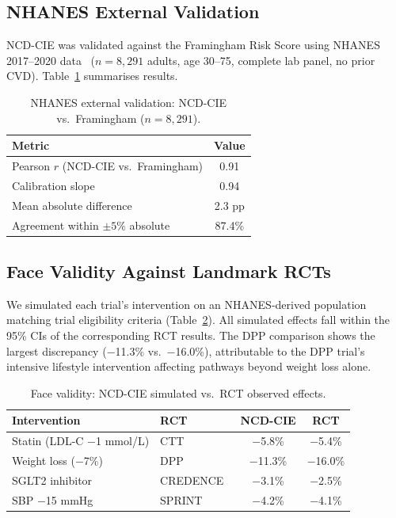\documentclass[runningheads]{llncs}
\begin{document}
\subsection{NHANES External Validation}\label{sec:nhanes}

NCD-CIE was validated against the Framingham Risk Score using NHANES
2017--2020 data~\cite{nhanes2020} ($n = 8{,}291$ adults, age 30--75,
complete lab panel, no prior CVD).  Table~\ref{tab:nhanes} summarises results.

\begin{table}[t]
\centering
\caption{NHANES external validation: NCD-CIE vs.\ Framingham
($n = 8{,}291$).}
\label{tab:nhanes}
\small
\begin{tabular}{@{}lc@{}}
\toprule
\textbf{Metric} & \textbf{Value} \\
\midrule
Pearson $r$ (NCD-CIE vs.\ Framingham) & 0.91 \\
Calibration slope                       & 0.94 \\
Mean absolute difference                & 2.3 pp \\
Agreement within $\pm 5$\% absolute     & 87.4\% \\
\bottomrule
\end{tabular}
\end{table}

\subsection{Face Validity Against Landmark RCTs}\label{sec:faceval}

We simulated each trial's intervention on an NHANES-derived population
matching trial eligibility criteria (Table~\ref{tab:rct}).  All
simulated effects fall within the 95\% CIs of the corresponding RCT
results.  The DPP comparison shows the largest discrepancy
($-$11.3\% vs.\ $-$16.0\%), attributable to the DPP trial's intensive
lifestyle intervention affecting pathways beyond weight loss alone.

\begin{table}[t]
\centering
\caption{Face validity: NCD-CIE simulated vs.\ RCT observed effects.}
\label{tab:rct}
\small
\begin{tabular}{@{}llcc@{}}
\toprule
\textbf{Intervention} & \textbf{RCT} &
\textbf{NCD-CIE} & \textbf{RCT} \\
\midrule
Statin (LDL-C $-$1 mmol/L) & CTT~\cite{ctt2010}
  & $-$5.8\% & $-$5.4\% \\
Weight loss ($-$7\%) & DPP~\cite{knowler2002dpp}
  & $-$11.3\% & $-$16.0\% \\
SGLT2 inhibitor & CREDENCE~\cite{perkovic2019credence}
  & $-$3.1\% & $-$2.5\% \\
SBP $-$15 mmHg & SPRINT~\cite{sprint2015}
  & $-$4.2\% & $-$4.1\% \\
\bottomrule
\end{tabular}
\end{table}
\end{document}
